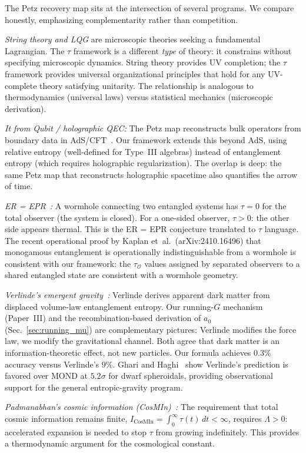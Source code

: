 \documentclass[prd,twocolumn,superscriptaddress,longbibliography,floatfix]{revtex4-2}
\newcommand{\tauasym}{\tau}
\newcommand{\tauO}{\tauasym_{\mathcal{O}}}
\begin{document}
The Petz recovery map sits at the intersection of
several programs.  We compare honestly, emphasizing
complementarity rather than competition.

\emph{String theory and LQG} are microscopic theories
seeking a fundamental Lagrangian.  The $\tauasym$
framework is a different \emph{type} of theory: it
constrains without specifying microscopic dynamics.
String theory provides UV completion; the $\tauasym$
framework provides universal organizational principles
that hold for any UV-complete theory satisfying
unitarity.  The relationship is analogous to
thermodynamics (universal laws) versus statistical
mechanics (microscopic derivation).

\emph{It from Qubit / holographic QEC:} The Petz
map reconstructs bulk operators from boundary data
in AdS/CFT~\cite{Cotler2019}.  Our framework
extends this beyond AdS, using relative entropy
(well-defined for Type~III algebras)
instead of entanglement entropy (which requires
holographic regularization).  The overlap is deep:
the same Petz map that reconstructs holographic
spacetime also quantifies the arrow of time.

\emph{ER = EPR~\cite{MaldacenaSusskind2013}:} A wormhole
connecting two entangled systems has $\tauasym = 0$ for
the total observer (the system is closed).  For a
one-sided observer, $\tauasym > 0$: the other side
appears thermal.  This is the ER = EPR
conjecture translated to $\tauasym$ language.
The recent operational proof by Kaplan et~al.\
(arXiv:2410.16496) that monogamous entanglement is
operationally indistinguishable from a wormhole is
consistent with our framework: the $\tauO$ values
assigned by separated observers to a shared entangled
state are consistent with a wormhole geometry.

\emph{Verlinde's emergent gravity~\cite{Verlinde2016}:}
Verlinde derives apparent dark matter from displaced
volume-law entanglement entropy.
Our running-$G$ mechanism (Paper~III) and the
recombination-based derivation of $a_0$
(Sec.~\ref{sec:running_mu})
are complementary pictures: Verlinde modifies the
force law, we modify the gravitational channel.  Both
agree that dark matter is an information-theoretic effect,
not new particles.  Our formula achieves $0.3\%$ accuracy
versus Verlinde's $9\%$.  Ghari and
Haghi~\cite{GhariHaghi2026} show Verlinde's prediction
is favored over MOND at $5.2\sigma$ for dwarf
spheroidals, providing observational support for the
general entropic-gravity program.

\emph{Padmanabhan's cosmic information
(CosMIn)~\cite{Padmanabhan2017}:}
The requirement that total cosmic information remains
finite, $I_{\mathrm{CosMIn}} = \int_0^\infty
\tauasym(t)\,dt < \infty$, requires $\Lambda > 0$:
accelerated expansion is needed to stop $\tauasym$
from growing indefinitely.  This provides a
thermodynamic argument for the cosmological
constant.
\end{document}

